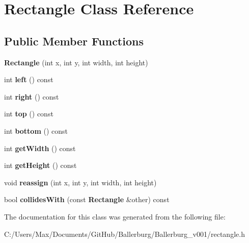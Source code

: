 \section{Rectangle Class Reference}
\label{class_rectangle}
\subsection*{Public Member Functions}
\begin{DoxyCompactItemize}
\item 
{\bfseries Rectangle} (int x, int y, int width, int height)\label{class_rectangle_a6fd48c1264965fd841b2d35b7736a352}

\item 
int {\bfseries left} () const \label{class_rectangle_a1f169cef3c9b8307e8dc7c6093bfdd14}

\item 
int {\bfseries right} () const \label{class_rectangle_a8e76ee84d39c8c063cb2ef0e1cb7f5df}

\item 
int {\bfseries top} () const \label{class_rectangle_a8eb6de2c6d532b2175bddd8484196eab}

\item 
int {\bfseries bottom} () const \label{class_rectangle_a46e18ff7c2ca4fd068442cabcd0b4046}

\item 
int {\bfseries get\+Width} () const \label{class_rectangle_a691ea1a449cad163e27bbf10ce65f98d}

\item 
int {\bfseries get\+Height} () const \label{class_rectangle_a45c28d3fd6b2f303530fb80b90e1c1c4}

\item 
void {\bfseries reassign} (int x, int y, int width, int height)\label{class_rectangle_a7f08779a8dbbd7cbf9ca6d8d31e272f8}

\item 
bool {\bfseries collides\+With} (const {\bf Rectangle} \&other) const \label{class_rectangle_a42278a22dbcfdfc05b22eebf7a9bda5d}

\end{DoxyCompactItemize}


The documentation for this class was generated from the following file\+:\begin{DoxyCompactItemize}
\item 
C\+:/\+Users/\+Max/\+Documents/\+Git\+Hub/\+Ballerburg/\+Ballerburg\+\_\+v001/rectangle.\+h\end{DoxyCompactItemize}
